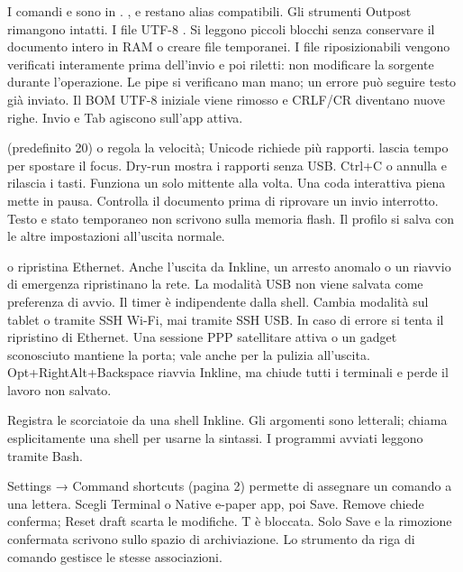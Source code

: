 I comandi  e  sono in
. ,  e
 restano alias compatibili. Gli strumenti Outpost rimangono intatti.
\UsbExamples
I file UTF-8 . Si leggono piccoli
blocchi senza conservare il documento intero in RAM o creare file temporanei.
I file riposizionabili vengono verificati interamente prima dell'invio e poi
riletti: non modificare la sorgente durante l'operazione. Le pipe si verificano
man mano; un errore può seguire testo già inviato. Il BOM UTF-8 iniziale viene
rimosso e CRLF/CR diventano nuove righe. Invio e Tab agiscono sull'app attiva.

 (predefinito 20) o  regola la velocità; Unicode
richiede più rapporti.  lascia tempo per spostare il focus.
Dry-run mostra i rapporti senza USB. Ctrl+C o  annulla e rilascia
i tasti. Funziona un solo mittente alla volta. Una coda interattiva piena mette
in pausa. Controlla il documento prima di riprovare un invio interrotto.
Testo e stato temporaneo non scrivono sulla memoria flash. Il profilo si salva
con le altre impostazioni all'uscita normale.

 o  ripristina Ethernet. Anche l'uscita da
Inkline, un arresto anomalo o un riavvio di emergenza ripristinano la rete.
La modalità USB non viene salvata come preferenza di avvio.
\UsbRecoveryExample
Il timer è indipendente dalla shell. Cambia modalità sul tablet o tramite SSH
Wi-Fi, mai tramite SSH USB. In caso di errore si tenta il ripristino di Ethernet.
Una sessione PPP satellitare attiva o un gadget sconosciuto mantiene la porta;
vale anche per la pulizia all'uscita. Opt+RightAlt+Backspace riavvia Inkline,
ma chiude tutti i terminali e perde il lavoro non salvato.

Registra le scorciatoie da una shell Inkline. Gli argomenti sono letterali;
chiama esplicitamente una shell per usarne la sintassi. I programmi avviati
leggono  tramite Bash.

Settings → Command shortcuts (pagina 2) permette di assegnare un comando a una lettera. Scegli Terminal o Native e-paper app, poi Save. Remove chiede conferma; Reset draft scarta le modifiche. T è bloccata. Solo Save e la rimozione confermata scrivono sullo spazio di archiviazione. Lo strumento da riga di comando gestisce le stesse associazioni.


